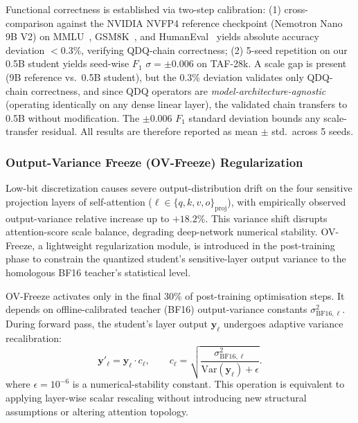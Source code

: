 \documentclass[11pt, a4paper]{article}
\begin{document}
Functional correctness is established via two-step calibration: (1) cross-comparison against the NVIDIA NVFP4 reference checkpoint (Nemotron Nano 9B V2) on MMLU~\cite{30}, GSM8K~\cite{31}, and HumanEval~\cite{32} yields absolute accuracy deviation $<0.3\%$, verifying QDQ-chain correctness; (2) 5-seed repetition on our 0.5B student yields seed-wise $F_1$ $\sigma = \pm 0.006$ on TAF-28k. A scale gap is present (9B reference vs.\ 0.5B student), but the 0.3\% deviation validates only QDQ-chain correctness, and since QDQ operators are \emph{model-architecture-agnostic} (operating identically on any dense linear layer), the validated chain transfers to 0.5B without modification. The $\pm 0.006$ $F_1$ standard deviation bounds any scale-transfer residual. All results are therefore reported as mean $\pm$ std.\ across 5 seeds.

\subsubsection{Output-Variance Freeze (OV-Freeze) Regularization}

Low-bit discretization causes severe output-distribution drift on the four sensitive projection layers of self-attention ($\ell \in \{q, k, v, o\}_{\mathrm{proj}}$), with empirically observed output-variance relative increase up to $+18.2\%$. This variance shift disrupts attention-score scale balance, degrading deep-network numerical stability. OV-Freeze, a lightweight regularization module, is introduced in the post-training phase to constrain the quantized student's sensitive-layer output variance to the homologous BF16 teacher's statistical level.

OV-Freeze activates only in the final 30\% of post-training optimisation steps. It depends on offline-calibrated teacher (BF16) output-variance constants $\sigma^2_{\mathrm{BF16},\ell}$. During forward pass, the student's layer output $\bm{y}_\ell$ undergoes adaptive variance recalibration:
\begin{equation}
\label{eq:ovf-rescale-en}
\bm{y}'_\ell = \bm{y}_\ell\cdot c_\ell, \qquad c_\ell = \sqrt{\frac{\sigma^2_{\mathrm{BF16},\ell}}{\mathrm{Var}(\bm{y}_\ell) + \epsilon}}.
\end{equation}
where $\epsilon = 10^{-6}$ is a numerical-stability constant. This operation is equivalent to applying layer-wise scalar rescaling without introducing new structural assumptions or altering attention topology.
\end{document}
